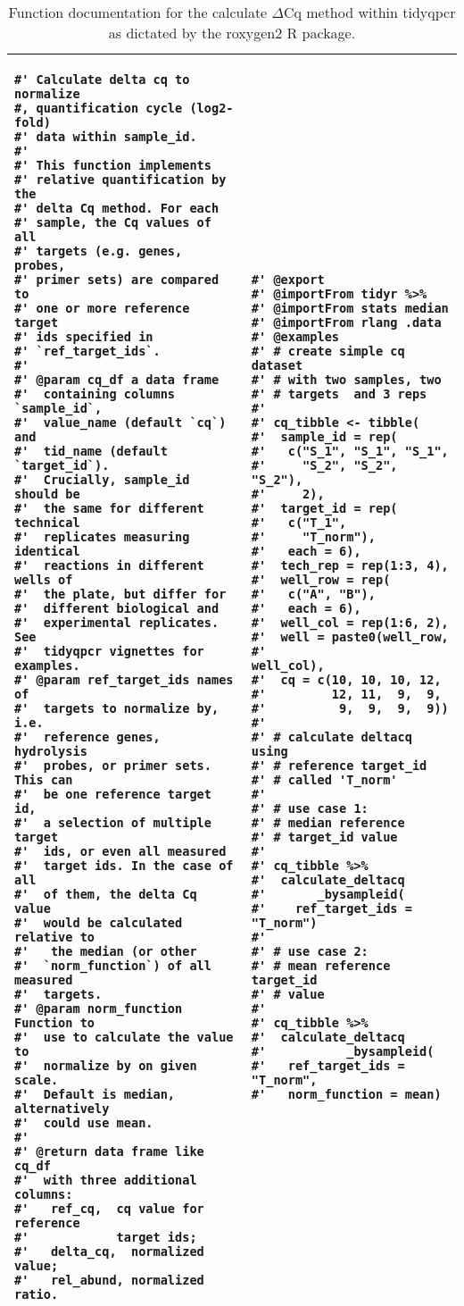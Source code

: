 \documentclass[../main.tex]{subfiles}
\begin{document}
\begin{table}
\centering
\begin{tabular}{| p{6.1cm}  p{5.6cm} |}
\hline
\begin{lstlisting}[style=mystyle]
#' Calculate delta cq to normalize 
#, quantification cycle (log2-fold)
#' data within sample_id.
#'
#' This function implements 
#' relative quantification by the 
#' delta Cq method. For each 
#' sample, the Cq values of all 
#' targets (e.g. genes, probes, 
#' primer sets) are compared to 
#' one or more reference target 
#' ids specified in 
#' `ref_target_ids`.
#'
#' @param cq_df a data frame 
#'  containing columns `sample_id`,
#'  value_name (default `cq`) and
#'  tid_name (default `target_id`).
#'  Crucially, sample_id should be
#'  the same for different technical
#'  replicates measuring identical 
#'  reactions in different wells of 
#'  the plate, but differ for 
#'  different biological and 
#'  experimental replicates. See 
#'  tidyqpcr vignettes for examples.
#' @param ref_target_ids names of 
#'  targets to normalize by, i.e. 
#'  reference genes, hydrolysis 
#'  probes, or primer sets. This can 
#'  be one reference target id,
#'  a selection of multiple target
#'  ids, or even all measured 
#'  target ids. In the case of all 
#'  of them, the delta Cq value 
#'  would be calculated relative to
#'   the median (or other 
#'  `norm_function`) of all measured 
#'  targets.
#' @param norm_function Function to 
#'  use to calculate the value to
#'  normalize by on given scale. 
#'  Default is median, alternatively 
#'  could use mean.
#'
#' @return data frame like cq_df 
#'  with three additional columns:
#'   ref_cq,  cq value for reference 
#'            target ids;
#'   delta_cq,  normalized value;
#'   rel_abund, normalized ratio.
\end{lstlisting} &
\begin{lstlisting}[firstnumber=52, style=mystyle]
#' @export
#' @importFrom tidyr %>%
#' @importFrom stats median
#' @importFrom rlang .data
#' @examples
#' # create simple cq dataset 
#' # with two samples, two 
#' # targets  and 3 reps
#'
#' cq_tibble <- tibble(
#'  sample_id = rep(
#'   c("S_1", "S_1", "S_1", 
#'     "S_2", "S_2", "S_2"),
#'     2),
#'  target_id = rep(
#'   c("T_1",
#'     "T_norm"),
#'   each = 6),
#'  tech_rep = rep(1:3, 4),
#'  well_row = rep(
#'   c("A", "B"),
#'   each = 6),
#'  well_col = rep(1:6, 2),
#'  well = paste0(well_row,
#'                well_col),
#'  cq = c(10, 10, 10, 12,
#'         12, 11,  9,  9, 
#'          9,  9,  9,  9))
#'                      
#' # calculate deltacq using
#' # reference target_id 
#' # called 'T_norm'
#' 
#' # use case 1: 
#' # median reference 
#' # target_id value
#'
#' cq_tibble %>%
#'  calculate_deltacq
#'       _bysampleid(
#'    ref_target_ids = "T_norm")
#' 
#' # use case 2: 
#' # mean reference target_id 
#' # value 
#'
#' cq_tibble %>%
#'  calculate_deltacq
#'           _bysampleid(
#'   ref_target_ids = "T_norm",
#'   norm_function = mean)
\end{lstlisting} \\
\hline
\end{tabular}
\caption*{Function documentation for the calculate $\Delta$Cq method within tidyqpcr as dictated by the roxygen2 R package.}
\label{function-documentation}
\end{table}
\end{document}
